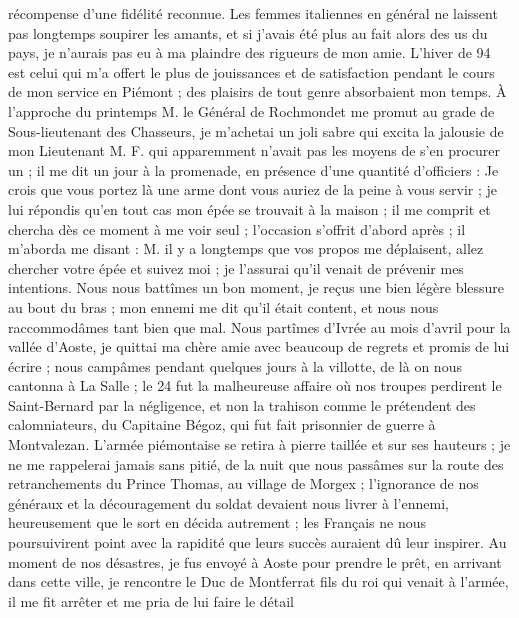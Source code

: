 \documentclass[12pt]{article}
\begin{document}
 récompense d’une fidélité reconnue. Les femmes italiennes
en général ne laissent pas longtemps soupirer les amants, et si j’avais été plus au fait alors des
us du pays, je n’aurais pas eu à ma plaindre des rigueurs de mon amie. L’hiver de 94 est celui qui
m’a offert le plus de jouissances et de satisfaction pendant le cours de mon service en Piémont ;
des plaisirs de tout genre absorbaient mon temps. À l’approche du printemps M. le Général de
Rochmondet me promut au grade de Sous-lieutenant des Chasseurs, je m’achetai un joli sabre qui
excita la jalousie de mon Lieutenant M. F. qui apparemment n’avait pas les moyens de s’en procurer
un ; il me dit un jour à la promenade, en présence d’une quantité d’officiers : Je crois que vous
portez là une arme dont vous auriez de la peine à vous servir ; je lui répondis qu’en tout cas mon
épée se trouvait à la maison ; il me comprit et chercha dès ce moment à me voir seul ; l’occasion
s’offrit d’abord après ; il m’aborda me disant : M. il y a longtemps que vos propos me déplaisent,
allez chercher votre épée et suivez moi ; je l’assurai qu’il venait de prévenir mes intentions. Nous
nous battîmes un bon moment, je reçus une bien légère blessure au bout du bras ; mon ennemi me dit
qu’il était content, et nous nous raccommodâmes tant bien que mal. Nous partîmes d’Ivrée au mois
d’avril pour la vallée d’Aoste, je quittai ma chère amie avec beaucoup de regrets et promis de lui
écrire ; nous campâmes pendant quelques jours à la villotte, de là on nous cantonna à La Salle ; le
24 fut la malheureuse affaire où nos troupes perdirent le Saint-Bernard par la négligence, et non la
trahison comme le prétendent des calomniateurs, du Capitaine Bégoz, qui fut fait prisonnier de
guerre à Montvalezan. L’armée piémontaise se retira à pierre taillée et sur ses hauteurs ; je ne me
rappelerai jamais sans pitié, de la nuit que nous passâmes sur la route des retranchements du Prince
Thomas, au village de Morgex ; l’ignorance de nos généraux et la découragement du soldat devaient
nous livrer à l’ennemi, heureusement que le sort en décida autrement ; les Français ne nous
poursuivirent point avec la rapidité que leurs succès auraient dû leur inspirer. Au moment de nos
désastres, je fus envoyé à Aoste pour prendre le prêt, en arrivant dans cette ville, je rencontre le
Duc de Montferrat fils du roi qui venait à l’armée, il me fit arrêter et me pria de lui faire le
détail
\end{document}

